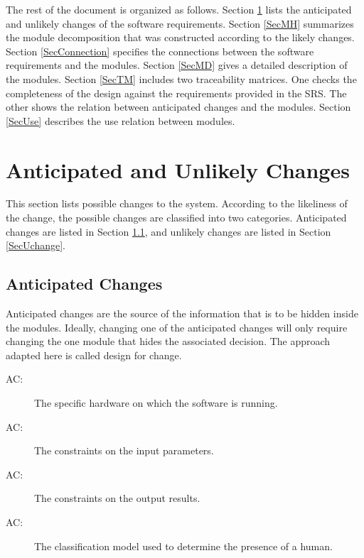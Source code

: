 \documentclass[12pt, titlepage]{article}
\newcounter{acnum}
\newcommand{\actheacnum}{AC\theacnum}
\begin{document}
The rest of the document is organized as follows. Section
\ref{SecChange} lists the anticipated and unlikely changes of the software
requirements. Section \ref{SecMH} summarizes the module decomposition that
was constructed according to the likely changes. Section \ref{SecConnection}
specifies the connections between the software requirements and the
modules. Section \ref{SecMD} gives a detailed description of the
modules. Section \ref{SecTM} includes two traceability matrices. One checks
the completeness of the design against the requirements provided in the SRS. The
other shows the relation between anticipated changes and the modules. Section
\ref{SecUse} describes the use relation between modules.

\section{Anticipated and Unlikely Changes} \label{SecChange}

This section lists possible changes to the system. According to the likeliness
of the change, the possible changes are classified into two
categories. Anticipated changes are listed in Section \ref{SecAchange}, and
unlikely changes are listed in Section \ref{SecUchange}.

\subsection{Anticipated Changes} \label{SecAchange}

Anticipated changes are the source of the information that is to be hidden
inside the modules. Ideally, changing one of the anticipated changes will only
require changing the one module that hides the associated decision. The approach
adapted here is called design for
change.

\begin{description}
\item[ \actheacnum \label{acHardware}:] The specific
  hardware on which the software is running.
\item[ \actheacnum \label{acConstraintIn}:] The constraints on
  the input parameters.
\item[ \actheacnum \label{acConstraintOut}:] The constraints on
  the output results.
\item[ \actheacnum \label{acProcess}:] The classification model 
  used to determine the presence of a human.
\end{description}
\end{document}
